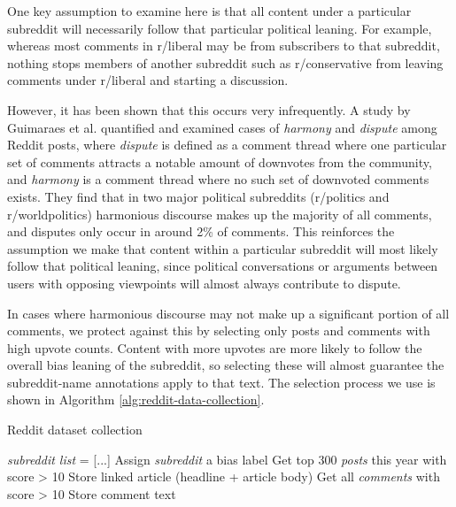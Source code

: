 One key assumption to examine here is that all content under a particular subreddit will necessarily follow that particular political leaning. For example, whereas most comments in r/liberal may be from subscribers to that subreddit, nothing stops members of another subreddit such as r/conservative from leaving comments under r/liberal and starting a discussion.

However, it has been shown that this occurs very infrequently. A study by Guimaraes et al. \cite{guimaraes} quantified and examined cases of \textit{harmony} and \textit{dispute} among Reddit posts, where \textit{dispute} is defined as a comment thread where one particular set of comments attracts a notable amount of downvotes from the community, and \textit{harmony} is a comment thread where no such set of downvoted comments exists. They find that in two major political subreddits (r/politics and r/worldpolitics) harmonious discourse makes up the majority of all comments, and disputes only occur in around 2\% of comments. This reinforces the assumption we make that content within a particular subreddit will most likely follow that political leaning, since political conversations or arguments between users with opposing viewpoints will almost always contribute to dispute.

In cases where harmonious discourse may not make up a significant portion of all comments, we protect against this by selecting only posts and comments with high upvote counts. Content with more upvotes are more likely to follow the overall bias leaning of the subreddit, so selecting these will almost guarantee the subreddit-name annotations apply to that text. The selection process we use is shown in Algorithm \ref{alg:reddit-data-collection}.

\begin{algorithm}
	\caption{Reddit dataset collection} \label{alg:reddit-data-collection}
	\begin{algorithmic}[1]
	    \State \textit{subreddit list} = [...] 
		    \State Assign \textit{subreddit} a bias label
		    \State Get top 300 \textit{posts} this year with score > 10
		        \State Store linked article (headline + article body)
		        \State Get all \textit{comments} with score > 10
		            \State Store comment text
		        \EndFor
			\EndFor
		\EndFor
	\end{algorithmic} 
\end{algorithm}


